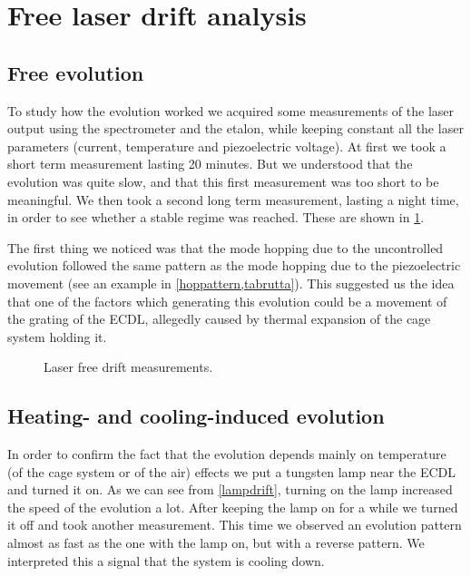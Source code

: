 \section{Free laser drift analysis}\label{freedrift}
\subsection{Free evolution}
To study how the evolution worked we acquired some measurements of the laser output using the spectrometer and the etalon, while keeping constant all the laser parameters (current, temperature and piezoelectric voltage). At first we took a short term measurement lasting 20 minutes. But we understood that the evolution was quite slow, and that this first measurement was too short to be meaningful. We then took a second long term measurement, lasting a night time, in order to see whether a stable regime was reached. These are shown in \cref{senzaniente}.

The first thing we noticed was that the mode hopping due to the uncontrolled evolution followed the same pattern as the mode hopping due to the piezoelectric movement (see an example in \cref{hoppattern,tabrutta}). This suggested us the idea that one of the factors which generating this evolution could be a movement of the grating of the ECDL, allegedly caused by thermal expansion of the cage system holding it. 

\begin{figure}[!hptb]\centering
{} 
\caption{Laser free drift measurements.}
\label{senzaniente}
\end{figure} 
 
\subsection{Heating- and cooling-induced evolution}

In order to confirm the fact that the evolution depends mainly on temperature (of the cage system or of the air) effects we put a tungsten lamp near the ECDL and turned it on. As we can see from \cref{lampdrift}, turning on the lamp increased the speed of the evolution a lot. After keeping the lamp on for a while we turned it off and took another measurement. This time we observed an evolution pattern almost as fast as the one with the lamp on, but with a reverse pattern. We interpreted this a signal that the system is cooling down.


